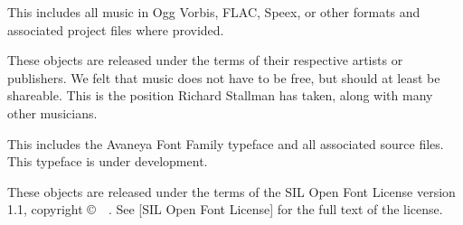 This includes all music in Ogg Vorbis, FLAC, Speex, or other formats and associated project files where provided.

These objects are released under the terms of their respective artists or publishers. We felt that music does not have to be free, but should at least be shareable. This is the position Richard Stallman has taken, along with many other musicians.


This includes the Avaneya Font Family typeface and all associated source files. This typeface is under development.

These objects are released under the terms of the SIL Open Font License version 1.1, copyright \copyright\ \CopyrightDates\ \CopyrightHolder. See [SIL Open Font License] for the full text of the license.
\stopitemize

\StopChapter

